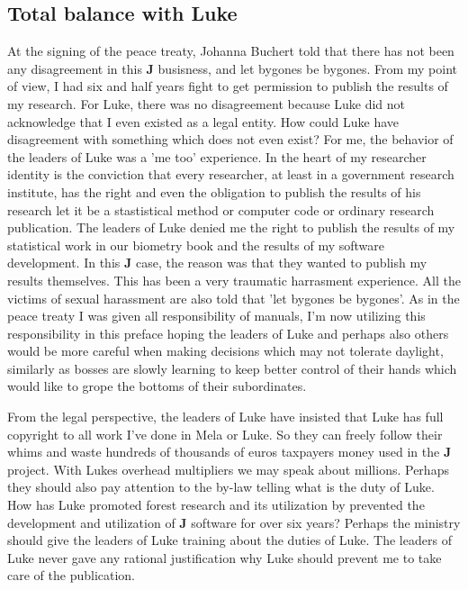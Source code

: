 \subsection{Total balance with Luke}
\label{preface8}
At the signing of the peace treaty, Johanna Buchert told that there has not been any
disagreement in this \textbf{J} busisness, and let bygones be bygones.
From my point of view, I had six and half years fight to get permission to
publish the results of my research.  For Luke, there was no
disagreement because Luke did not acknowledge that I even existed as a
legal entity. How could Luke
have disagreement with something which does not even exist? For me,
the behavior of the leaders of Luke was a 'me too' experience. In
the heart of my researcher
identity is the conviction that every researcher, at least in a government
research institute, has the right and even the obligation to publish the
results of his research let it be a stastistical method or computer code or
ordinary research publication.
The leaders of Luke denied
me the right to publish the results of my statistical work
in our biometry book and the results of my software development.  In this \textbf{J} case,
the reason was that they
wanted to publish my results themselves.  This has been a very traumatic
harrasment experience. All the victims of sexual harassment are also
told that 'let bygones be bygones'.
As in the peace treaty I was given all responsibility of manuals, I'm
now utilizing this responsibility in this preface hoping the leaders of
Luke and perhaps also others
would be more careful when making decisions which may not tolerate daylight,
similarly
as bosses are slowly learning to keep better control of
their hands which would like
to grope the bottoms of their subordinates.

From the legal perspective, the leaders of Luke have insisted that
Luke has full copyright to all work I've done in Mela or Luke. So they can freely
follow their whims and waste hundreds of thousands of euros
taxpayers money used in the \textbf{J} project.
With Lukes overhead multipliers we may speak about millions.
Perhaps they should also pay
attention to the by-law telling what is the duty of Luke. How has
Luke promoted forest research and its utilization by prevented
the development and
utilization of \textbf{J} software for over six years?
Perhaps the ministry should  give
the leaders of Luke training about the duties of Luke. The leaders
of Luke never gave any rational justification why Luke should prevent me
to take care of the publication.


